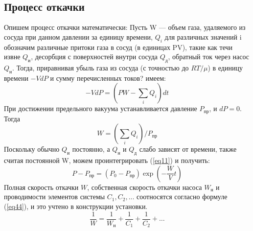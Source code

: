 \documentclass{article}
\newcommand{\x}{\text}
\begin{document}
\subsection*{Процесс откачки}
Опишем процесс откачки математически:
Пусть W --- объем газа, удаляемого из сосуда при данном давлении за единицу времени, $Q_i$ для различных значений i обозначим различные притоки газа в сосуд (в единицах PV), такие как течи извне $Q_\text{и}$, десорбция с поверхностей внутри сосуда $Q_\text{д}$, обратный ток через насос $Q_\text{н}$. Тогда, приравнивая убыль газа из сосуда (с точностью до $RT/\mu$) в единицу времени $-VdP$ и сумму перечисленных токов? имеем:
\begin{equation}\label{eq11}
    -VdP = (PW - \sum_i Q_i)dt
\end{equation}
При достижении предельного вакуума устанавливается давление $P_{\text{пр}}$, и $dP = 0$. Тогда
\begin{equation}\label{eq22}
    W = ( \sum_i Q_i )/P_{\text{пр}}
\end{equation}
Поскольку обычно $Q_\text{и}$ постоянно, а $Q_\text{н}$ и $Q_\text{д}$ слабо зависят от времени, также считая постоянной W, можем проинтегрировать (\ref{eq11}) и получить:
\begin{equation}\label{that_one}
    P - P_{\text{пр}} = (P_0 - P_{\text{пр}})\exp(-\frac{W}{V}t)
\end{equation}
Полная скорость откачки $W$, собственная скорость откачки насоса $W_{\text{н}}$ и проводимости элементов системы $C_1, C_2,...$ соотносятся согласно формуле (\ref{eq44}), и это учтено в конструкции установки.
\begin{equation}\label{eq44}
    \frac{1}{W} = \frac{1}{W_\x{н}} + \frac{1}{C_1} + \frac{1}{C_2} + \ldots
\end{equation}
\end{document}
